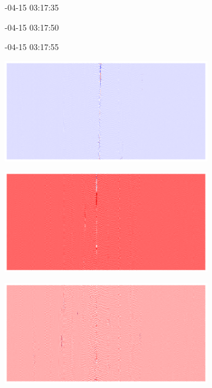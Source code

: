 \begin{figure}[!h]
\centering
\begin{subfigure}{0.33\textwidth}
-04-15 03:17:35
\end{subfigure}%
\hfill
\begin{subfigure}{0.33\textwidth}
-04-15 03:17:50
\end{subfigure}%
\hfill
\begin{subfigure}{0.33\textwidth}
-04-15 03:17:55
\end{subfigure}

    \vspace{1em}
    
    \begin{subfigure}{0.33\textwidth}
        \includegraphics[width=\textwidth]{figures/anomalies/before/20190415_031735.png}
    \end{subfigure}%
    \hfill
    \begin{subfigure}{0.33\textwidth}
        \includegraphics[width=\textwidth]{figures/anomalies/before/20190415_031750.png}
    \end{subfigure}%
    \hfill
    \begin{subfigure}{0.33\textwidth}
        \includegraphics[width=\textwidth]{figures/anomalies/before/20190415_031755.png}

\end{subfigure}
\end{figure}
